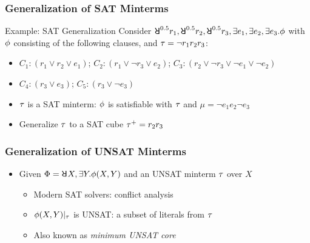 \begin{frame}
    \frametitle{Generalization of SAT Minterms}
    \begin{block}{Example: SAT Generalization}
        Consider $\random{0.5}r_1,\random{0.5}r_2,\random{0.5}r_3,\exists e_1,\exists e_2,\exists e_3.\pf$ with $\phi$ consisting of the following clauses, and $\tau=\lnot r_1r_2r_3$:
        \begin{itemize}
            \item[] $C_1: (r_1 \lor r_2 \lor e_1)$; $C_2: (r_1 \lor \lnot r_3 \lor e_2)$; $C_3: (r_2 \lor \lnot r_3 \lor \lnot e_1 \lor \lnot e_2)$
            \item[] $C_4: (r_3 \lor e_3)$; $C_5: (r_3 \lor \lnot e_3)$
                  \pause
        \end{itemize}
        \begin{itemize}
            \item $\tau$ is a SAT minterm: $\phi$ is satisfiable with $\tau$ and $\mu=\lnot e_1e_2\lnot e_3$
                  \pause
            \item Generalize $\tau$ to a SAT cube $\tau^+=r_2r_3$
        \end{itemize}
    \end{block}
\end{frame}

\begin{frame}
    \frametitle{Generalization of UNSAT Minterms}
    \begin{itemize}
        \item Given $\Qf=\random{} X,\exists Y.\pf(X,Y)$ and an UNSAT minterm $\tau$ over $X$
              \pause
              \begin{itemize}
                  \item Modern SAT solvers: conflict analysis
                        \pause
                  \item $\phi(X,Y)|_{\tau}$ is UNSAT: a subset of literals from $\tau$
                        \pause
                  \item Also known as \textit{minimum UNSAT core}
              \end{itemize}
    \end{itemize}
\end{frame}

